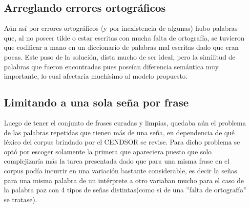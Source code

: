 %
\subsection{Arreglando errores ortográficos}

Aún así por errores ortográficos (y por inexistencia de algunas) hubo palabras que, al no poseer tilde o estar escritas con mucha falta de ortografía, se tuvieron que codificar a mano en un diccionario de palabras mal escritas dado que eran pocas. Este paso de la solución, dista mucho de ser ideal, pero la similitud de palabras que fueron encontradas pues poseían diferencia semántica muy importante, lo cual afectaría muchísimo al modelo propuesto.

\subsection{Limitando a una sola seña por frase}
Luego de tener el conjunto de frases curadas y limpias, quedaba aún el problema de las palabras repetidas que tienen más de una seña, en dependencia de qué léxico del corpus brindado por el CENDSOR se revise.
Para dicho problema se optó por escoger solamente la primera que apareciera puesto que solo complejizaría más la tarea presentada dado que para una misma frase en el corpus podía incurrir en una variación bastante considerable, es decir la señas para una misma palabra de un intérprete a otro variaban mucho para el caso de la palabra paz con 4 tipos de señas distintas(como si de una ''falta de ortografía'' se tratase). 

